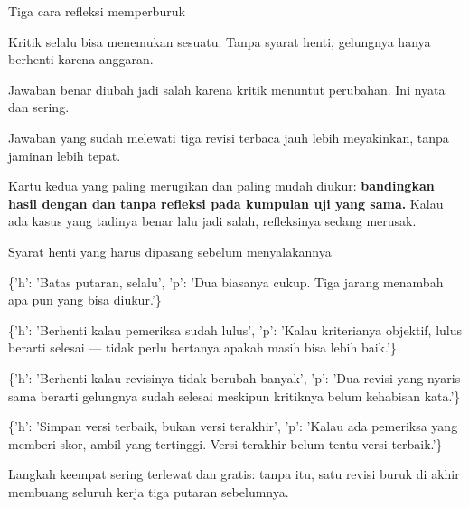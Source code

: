 \documentclass[aspectratio=169,11pt,t]{beamer}
\begin{document}
\begin{frame}[shrink=25]{Tiga cara refleksi memperburuk}
\begin{minipage}[t]{0.3253\textwidth}
\begin{icardbad}
Kritik selalu bisa menemukan sesuatu. Tanpa syarat henti, gelungnya hanya berhenti karena anggaran.
\end{icardbad}
\end{minipage}%
\hfill
\begin{minipage}[t]{0.3253\textwidth}
\begin{icardbad}
Jawaban benar diubah jadi salah karena kritik menuntut perubahan. Ini nyata dan sering.
\end{icardbad}
\end{minipage}%
\hfill
\begin{minipage}[t]{0.3253\textwidth}
\begin{icardbad}
Jawaban yang sudah melewati tiga revisi terbaca jauh lebih meyakinkan, tanpa jaminan lebih tepat.
\end{icardbad}
\end{minipage}%
\begin{iband}[signal]
Kartu kedua yang paling merugikan dan paling mudah diukur: \textbf{bandingkan hasil dengan dan tanpa refleksi pada kumpulan uji yang sama.} Kalau ada kasus yang tadinya benar lalu jadi salah, refleksinya sedang merusak.
\end{iband}
\end{frame}

\begin{frame}[shrink=25]{Syarat henti yang harus dipasang sebelum menyalakannya}
\begin{isteps}
\item \{'h': 'Batas putaran, selalu', 'p': 'Dua biasanya cukup. Tiga jarang menambah apa pun yang bisa diukur.'\}
\item \{'h': 'Berhenti kalau pemeriksa sudah lulus', 'p': 'Kalau kriterianya objektif, lulus berarti selesai --- tidak perlu bertanya apakah masih bisa lebih baik.'\}
\item \{'h': 'Berhenti kalau revisinya tidak berubah banyak', 'p': 'Dua revisi yang nyaris sama berarti gelungnya sudah selesai meskipun kritiknya belum kehabisan kata.'\}
\item \{'h': 'Simpan versi terbaik, bukan versi terakhir', 'p': 'Kalau ada pemeriksa yang memberi skor, ambil yang tertinggi. Versi terakhir belum tentu versi terbaik.'\}
\end{isteps}
\begin{iband}[signal]
Langkah keempat sering terlewat dan gratis: tanpa itu, satu revisi buruk di akhir membuang seluruh kerja tiga putaran sebelumnya.
\end{iband}
\end{frame}
\end{document}
